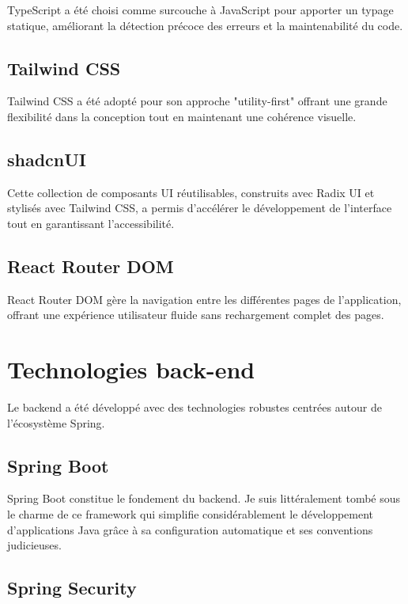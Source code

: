 \documentclass[12pt,a4paper]{report}
\begin{document}
TypeScript a été choisi comme surcouche à JavaScript pour apporter un typage statique, améliorant la détection précoce des erreurs et la maintenabilité du code.

\subsection{Tailwind CSS}

Tailwind CSS a été adopté pour son approche "utility-first" offrant une grande flexibilité dans la conception tout en maintenant une cohérence visuelle.

\subsection{shadcnUI}

Cette collection de composants UI réutilisables, construits avec Radix UI et stylisés avec Tailwind CSS, a permis d'accélérer le développement de l'interface tout en garantissant l'accessibilité.

\subsection{React Router DOM}

React Router DOM gère la navigation entre les différentes pages de l'application, offrant une expérience utilisateur fluide sans rechargement complet des pages.

\section{Technologies back-end}

Le backend a été développé avec des technologies robustes centrées autour de l'écosystème Spring.

\subsection{Spring Boot}

Spring Boot constitue le fondement du backend. Je suis littéralement tombé sous le charme de ce framework qui simplifie considérablement le développement d'applications Java grâce à sa configuration automatique et ses conventions judicieuses.

\subsection{Spring Security}
\end{document}
